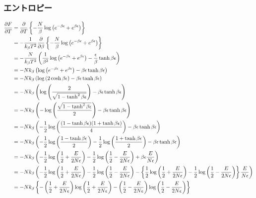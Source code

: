\documentclass[dvipdfmx, 11pt, a4paper]{jsarticle}
\theoremstyle{definition}
\begin{document}
\subsubsection{エントロピー}
    \begin{align}
        \frac{\partial F}{\partial T} &= \frac{\partial}{\partial T} \left\{ -\frac{N}{\beta} \log \left( e^{-\beta \epsilon} + e^{\beta \epsilon} \right)  \right\} \notag \\
        &= -\frac{1}{k_\beta T^2} \frac{\partial }{\partial \beta} \left\{ -\frac{N}{\beta} \log \left( e^{-\beta \epsilon} + e^{\beta \epsilon} \right)  \right\} \notag \\
        &= -\frac{N}{k_\beta T^2} \left( \frac{1}{\beta^2}  \log \left( e^{-\beta \epsilon} + e^{\beta \epsilon} \right) - \frac{\epsilon}{\beta} \tanh \beta \epsilon \right) \notag \\
        &= -Nk_\beta \left( \log \left( e^{-\beta \epsilon} + e^{\beta \epsilon} \right) - \beta \epsilon \tanh \beta \epsilon \right) \notag \\
        &= -Nk_\beta \left( \log \left( 2\cosh \beta \epsilon \right) - \beta \epsilon \tanh \beta \epsilon \right) \\
        &= -Nk_\beta \left( \log \left( \frac{2}{\sqrt{1 - \tanh^2 \beta \epsilon }} \right) - \beta \epsilon \tanh \beta \epsilon \right) \notag \\
        &= -Nk_\beta \left( -\log \left( \frac{\sqrt{1 - \tanh^2 \beta \epsilon }}{2} \right) - \beta \epsilon \tanh \beta \epsilon \right) \notag \\
        &= -Nk_\beta \left( -\frac{1}{2}\log \left( \frac{(1 - \tanh \beta \epsilon)(1 + \tanh \beta \epsilon) }{4} \right) - \beta \epsilon \tanh \beta \epsilon \right) \notag \\
        &= -Nk_\beta \left( -\frac{1}{2}\log \left( \frac{1 - \tanh \beta \epsilon}{2} \right) -\frac{1}{2}\log \left( \frac{1 + \tanh \beta \epsilon }{2} \right) - \beta \epsilon \tanh \beta \epsilon \right) \notag \\
        &= -Nk_\beta \left( -\frac{1}{2}\log \left( \frac{1}{2} + \frac{E}{2N\epsilon} \right) -\frac{1}{2}\log \left( \frac{1}{2} - \frac{E}{2N\epsilon} \right) + \beta \epsilon \frac{E}{N\epsilon} \right) \notag \\
        &= -Nk_\beta \left( -\frac{1}{2}\log \left( \frac{1}{2} + \frac{E}{2N\epsilon} \right) -\frac{1}{2}\log \left( \frac{1}{2} - \frac{E}{2N\epsilon} \right) - \left\{ \frac{1}{2} \log \left( \frac{1}{2} + \frac{E}{2N\epsilon} \right) - \frac{1}{2} \log \left( \frac{1}{2} - \frac{E}{2N\epsilon} \right) \right\} \frac{E}{N\epsilon} \right) \notag \\
        &= -Nk_\beta \left\{ -\left( \frac{1}{2} + \frac{E}{2N\epsilon} \right) \log \left( \frac{1}{2} + \frac{E}{2N\epsilon} \right) - \left( \frac{1}{2} - \frac{E}{2N\epsilon} \right) \log \left( \frac{1}{2} - \frac{E}{2N\epsilon} \right) \right\} 
    \end{align}
\end{document}
